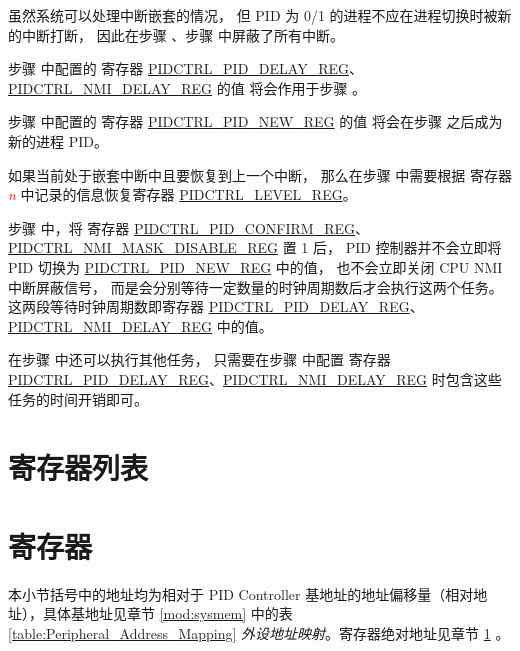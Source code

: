 \documentclass[main\_\_CN.tex]{subfiles}
\begin{document}
虽然系统可以处理中断嵌套的情况，
但 PID 为 0/1 的进程不应在进程切换时被新的中断打断，
因此在步骤 、步骤  中屏蔽了所有中断。

步骤  中配置的
寄存器 \hyperref[regdesc:PIDCTRLPIDDELAYREG]{PIDCTRL\_PID\_DELAY\_REG}、\hyperref[regdesc:PIDCTRLNMIDELAYREG]{PIDCTRL\_NMI\_DELAY\_REG} 的值
将会作用于步骤 。

步骤  中配置的
寄存器 \hyperref[regdesc:PIDCTRLPIDNEWREG]{PIDCTRL\_PID\_NEW\_REG} 的值
将会在步骤  之后成为新的进程 PID。

如果当前处于嵌套中断中且要恢复到上一个中断，
那么在步骤  中需要根据
寄存器 \textcolor{red}{\it{n}} 中记录的信息恢复寄存器 \hyperref[regdesc:PIDCTRLLEVELREG]{PIDCTRL\_LEVEL\_REG}。

步骤  中，将
寄存器 \hyperref[regdesc:PIDCTRLPIDCONFIRMREG]{PIDCTRL\_PID\_CONFIRM\_REG}、\hyperref[regdesc:PIDCTRLNMIMASKDISABLEREG]{PIDCTRL\_NMI\_MASK\_DISABLE\_REG} 置 1 后，
PID 控制器并不会立即将 PID 切换为 \hyperref[regdesc:PIDCTRLPIDNEWREG]{PIDCTRL\_PID\_NEW\_REG} 中的值，
也不会立即关闭 CPU NMI 中断屏蔽信号，
而是会分别等待一定数量的时钟周期数后才会执行这两个任务。
这两段等待时钟周期数即寄存器 \hyperref[regdesc:PIDCTRLPIDDELAYREG]{PIDCTRL\_PID\_DELAY\_REG}、\hyperref[regdesc:PIDCTRLNMIDELAYREG]{PIDCTRL\_NMI\_DELAY\_REG} 中的值。

在步骤  中还可以执行其他任务，
只需要在步骤  中配置
寄存器 \hyperref[regdesc:PIDCTRLPIDDELAYREG]{PIDCTRL\_PID\_DELAY\_REG}、\hyperref[regdesc:PIDCTRLNMIDELAYREG]{PIDCTRL\_NMI\_DELAY\_REG} 时包含这些任务的时间开销即可。

\hypertarget{pidctrl-reg-summ}{}
\section{寄存器列表}\label{sec:pidctrl-reg-summ}



\section{寄存器}

本小节括号中的地址均为相对于 PID Controller 基地址的地址偏移量（相对地址），具体基地址见章节 \ref{mod:sysmem} \textit{} 中的表 \ref{table:Peripheral_Address_Mapping} \textit{外设地址映射}。寄存器绝对地址见章节 \ref{sec:pidctrl-reg-summ} \textit{}。


\end{document}
